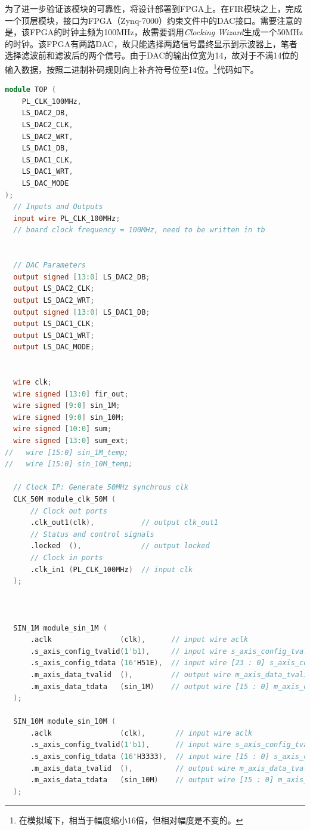 \documentclass[lang=cn,newtx,10pt,scheme=chinese]{elegantbook}
\begin{document}
为了进一步验证该模块的可靠性，将设计部署到FPGA上。在FIR模块之上，完成一个顶层模块，接口为FPGA（Zynq-7000）约束文件中的DAC接口。需要注意的是，该FPGA的时钟主频为100MHz，故需要调用\textit{Clocking Wizard}生成一个50MHz的时钟。该FPGA有两路DAC，故只能选择两路信号最终显示到示波器上，笔者选择滤波前和滤波后的两个信号。由于DAC的输出位宽为14，故对于不满14位的输入数据，按照二进制补码规则向上补齐符号位至14位。\footnote{在模拟域下，相当于幅度缩小16倍，但相对幅度是不变的。}代码如下。

\begin{lstlisting}[language=verilog,caption={顶层模块}]
  module TOP (
    PL_CLK_100MHz,
    LS_DAC2_DB,
    LS_DAC2_CLK,
    LS_DAC2_WRT,
    LS_DAC1_DB,
    LS_DAC1_CLK,
    LS_DAC1_WRT,
    LS_DAC_MODE
);
  // Inputs and Outputs
  input wire PL_CLK_100MHz;
  // board clock frequency = 100MHz, need to be written in tb


  // DAC Parameters
  output signed [13:0] LS_DAC2_DB;
  output LS_DAC2_CLK;
  output LS_DAC2_WRT;
  output signed [13:0] LS_DAC1_DB;
  output LS_DAC1_CLK;
  output LS_DAC1_WRT;
  output LS_DAC_MODE;


  wire clk;
  wire signed [13:0] fir_out;
  wire signed [9:0] sin_1M;
  wire signed [9:0] sin_10M;
  wire signed [10:0] sum;
  wire signed [13:0] sum_ext;
//   wire [15:0] sin_1M_temp;
//   wire [15:0] sin_10M_temp;

  // Clock IP: Generate 50MHz synchrous clk 
  CLK_50M module_clk_50M (
      // Clock out ports
      .clk_out1(clk),           // output clk_out1
      // Status and control signals
      .locked  (),              // output locked
      // Clock in ports
      .clk_in1 (PL_CLK_100MHz)  // input clk
  );



  SIN_1M module_sin_1M (
      .aclk                (clk),      // input wire aclk
      .s_axis_config_tvalid(1'b1),     // input wire s_axis_config_tvalid
      .s_axis_config_tdata (16'H51E),  // input wire [23 : 0] s_axis_config_tdata
      .m_axis_data_tvalid  (),         // output wire m_axis_data_tvalid
      .m_axis_data_tdata   (sin_1M)    // output wire [15 : 0] m_axis_data_tdata
  );

  SIN_10M module_sin_10M (
      .aclk                (clk),       // input wire aclk
      .s_axis_config_tvalid(1'b1),      // input wire s_axis_config_tvalid
      .s_axis_config_tdata (16'H3333),  // input wire [15 : 0] s_axis_config_tdata
      .m_axis_data_tvalid  (),          // output wire m_axis_data_tvalid
      .m_axis_data_tdata   (sin_10M)    // output wire [15 : 0] m_axis_data_tdata
  );


\end{lstlisting}
\end{document}
